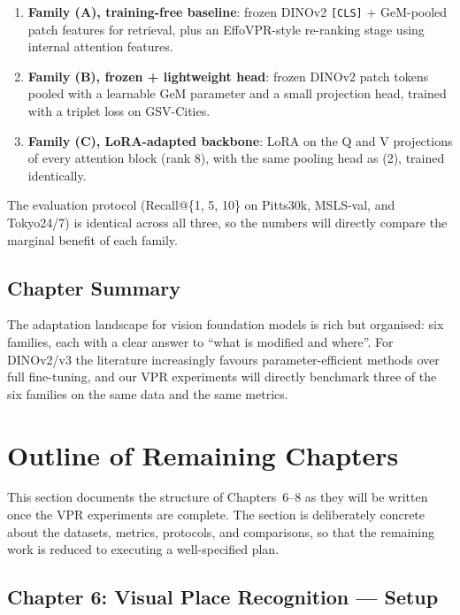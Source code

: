 \documentclass[11pt,a4paper]{article}
\begin{document}
\begin{enumerate}[leftmargin=*]
  \item \textbf{Family (A), training-free baseline}: frozen DINOv2
  \texttt{[CLS]} + GeM-pooled patch features for retrieval, plus an
  EffoVPR-style re-ranking stage using internal attention features.
  \item \textbf{Family (B), frozen + lightweight head}: frozen DINOv2
  patch tokens pooled with a learnable GeM parameter and a small
  projection head, trained with a triplet loss on GSV-Cities.
  \item \textbf{Family (C), LoRA-adapted backbone}: LoRA on the Q and V
  projections of every attention block (rank 8), with the same pooling
  head as (2), trained identically.
\end{enumerate}

The evaluation protocol (Recall@\{1, 5, 10\} on Pitts30k, MSLS-val, and
Tokyo24/7) is identical across all three, so the numbers will directly
compare the marginal benefit of each family.

\subsection{Chapter Summary}

The adaptation landscape for vision foundation models is rich but
organised: six families, each with a clear answer to ``what is modified
and where''. For DINOv2/v3 the literature increasingly favours
parameter-efficient methods over full fine-tuning, and our VPR
experiments will directly benchmark three of the six families on the
same data and the same metrics.

\newpage
\section{Outline of Remaining Chapters}
\label{sec:planned}

This section documents the structure of Chapters~6--8 as they will be
written once the VPR experiments are complete. The section is deliberately
concrete about the datasets, metrics, protocols, and comparisons, so that
the remaining work is reduced to executing a well-specified plan.

\subsection*{Chapter 6: Visual Place Recognition --- Setup}
\label{ch:vpr-setup}
\end{document}
